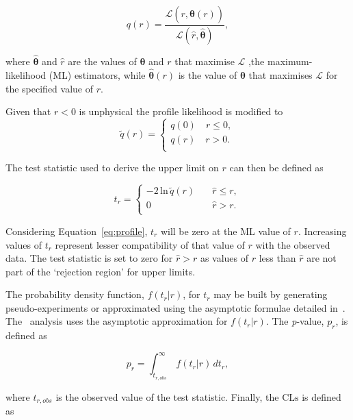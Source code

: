 \begin{equation}
\label{eq:profile}
q(r) = \frac{\mathcal{L}(r,\hat{\boldsymbol{\theta}}(r))}{\mathcal{L}(\hat{r},\hat{\boldsymbol{\theta}})},
\end{equation}

\noindent where $\hat{\boldsymbol{\theta}}$ and $\hat{r}$ are the values of $\boldsymbol{\theta}$ and $r$ that maximise $\mathcal{L}$
,the maximum-likelihood (ML) estimators, while $\hat{\boldsymbol{\theta}}(r)$ is the value
of $\boldsymbol{\theta}$ that maximises $\mathcal{L}$ for the specified value of $r$. 

Given that $r < 0$ is unphysical the profile likelihood is modified to
\begin{equation}
\label{eq:profileNew}
\tilde{q}(r) = 
\begin{cases}
q(0)\quad r \le 0, \\ 
q(r)\quad r > 0. \\ 
\end{cases}
\end{equation}

The test statistic used to derive the upper limit on $r$ can then be defined as

\begin{equation}
t_r = 
\begin{cases}
-2\,\text{ln}\,\tilde{q}(r)\quad &\hat{r} \le r, \\ 
0 \quad &\hat{r} > r. \\ 
\end{cases}
\end{equation}

Considering Equation~\ref{eq:profile}, $t_r$ will be zero at the ML value of $r$.
Increasing values of $t_r$ represent lesser compatibility of that value of $r$ with
the observed data. The test statistic is set to zero for $\hat{r} > r$ as
values of $r$ less than $\hat{r}$ are not part of the `rejection region' for upper limits. 

The probability density function, $f(t_r|r)$, for $t_r$ may be built by 
generating pseudo-experiments or approximated using the asymptotic formulae 
detailed in~\cite{asymp}. The \alphat~analysis uses the asymptotic
approximation for $f(t_r|r)$. The \textit{p}-value, $p_r$, is defined as

\begin{equation}
p_r = \int_{t_{r,obs}}^{\infty}\, f(t_r|r)\, dt_r,
\end{equation}

\noindent where ${t_{r,obs}}$ is the observed value of the test statistic. Finally,
the $\text{CLs}$ is defined as

